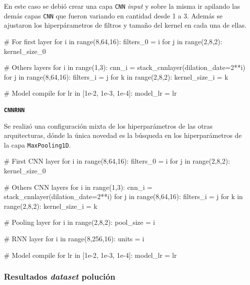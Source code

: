 \documentclass[a4paper,12pt]{article}
\begin{document}
En este caso se debió crear una capa \texttt{CNN} \textit{input} y sobre la misma ir apilando las demás capas \texttt{CNN} que fueron variando en cantidad desde 1 a 3.
Además se ajustaron los hiperpárametros de filtros y tamaño del kernel en cada una de ellas.
 
\begin{python}
# For first layer
for i in range(8,64,16):
	filters_0 = i
	for j in range(2,8,2):
		kernel_size_0

# Others layers
for i in range(1,3):
	cnn_i = stack_cnnlayer(dilation_date=2**i)
	for j in range(8,64,16):
		filters_i = j
		for k in range(2,8,2):
			kernel_size_i = k

# Model compile
for lr in [1e-2, 1e-3, 1e-4]:
	model_lr = lr
\end{python}

\textbf{\texttt{CNNRNN}}

Se realizó una configuración mixta de los hiperparámetros de las otras arquitecturas, dónde la única novedad es la búsqueda en los hiperparámetros de la capa \texttt{MaxPooling1D}.

\begin{python}
# First CNN layer
for i in range(8,64,16):
	filters_0 = i
	for j in range(2,8,2):
		kernel_size_0

# Others CNN layers
for i in range(1,3):
	cnn_i = stack_cnnlayer(dilation_date=2**i)
	for j in range(8,64,16):
		filters_i = j
		for k in range(2,8,2):
			kernel_size_i = k
			
# Pooling layer
for i in range(2,8,2):
	pool_size = i
	
# RNN layer
for i in range(8,256,16):
	units = i
	
# Model compile
for lr in [1e-2, 1e-3, 1e-4]:
	model_lr = lr
\end{python}

\subsubsection{Resultados \textit{dataset} polución}
\end{document}
